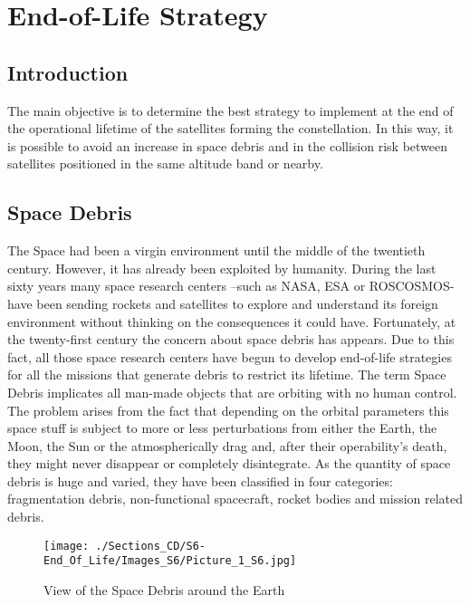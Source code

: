 \section{End-of-Life Strategy}

\subsection{Introduction}

The main objective is to determine the best strategy to implement at the end of the operational lifetime of the satellites forming the constellation. In this way, it is possible to avoid an increase in space debris and in the collision risk between satellites positioned in the same altitude band or nearby.

\subsection{Space Debris}
The Space had been a virgin environment until the middle of the twentieth century. However, it has already been exploited by humanity. During the last sixty years many space research centers –such as NASA, ESA or ROSCOSMOS- have been sending rockets and satellites to explore and understand its foreign environment without thinking on the consequences it could have. Fortunately, at the twenty-first century the concern about space debris has appears. Due to this fact, all those space research centers have begun to develop end-of-life strategies for all the missions that generate debris to restrict its lifetime. 
\newline
\newline
The term Space Debris implicates all man-made objects that are orbiting with no human control. The problem arises from the fact that depending on the orbital parameters this space stuff is subject to more or less perturbations from either the Earth, the Moon, the Sun or the atmospherically drag and, after their operability’s death, they might never disappear or completely disintegrate. As the quantity of space debris is huge and varied, they have been classified in four categories: fragmentation debris, non-functional spacecraft, rocket bodies and mission related debris. 
\newline
\newline
\begin{figure}
\centering 
\texttt{[image: ./Sections\_CD/S6-End\_Of\_Life/Images\_S6/Picture\_1\_S6.jpg]} 
\caption{View of the Space Debris around the Earth}
\end{figure}
